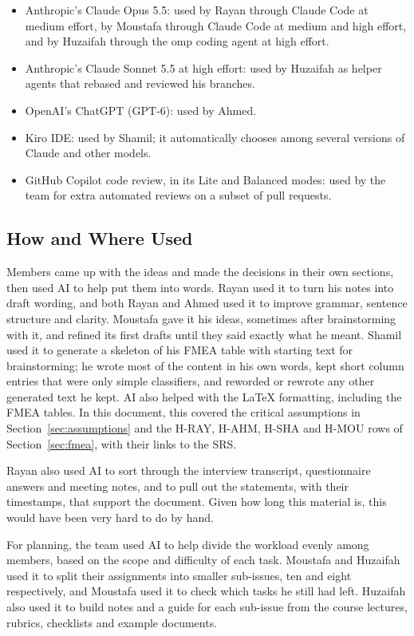 \documentclass{article}
\begin{document}
\begin{itemize}
  \item Anthropic's Claude Opus 5.5: used by Rayan through Claude Code at
    medium effort, by Moustafa through Claude Code at medium and high
    effort, and by Huzaifah through the omp coding agent at high effort.
  \item Anthropic's Claude Sonnet 5.5 at high effort: used by Huzaifah as
    helper agents that rebased and reviewed his branches.
  \item OpenAI's ChatGPT (GPT-6): used by Ahmed.
  \item Kiro IDE: used by Shamil; it automatically chooses among several
    versions of Claude and other models.
  \item GitHub Copilot code review, in its Lite and Balanced modes: used by
    the team for extra automated reviews on a subset of pull requests.
\end{itemize}

\subsection{How and Where Used}

Members came up with the ideas and made the decisions in their own sections,
then used AI to help put them into words. Rayan used it to turn his notes
into draft wording, and both Rayan and Ahmed used it to improve grammar,
sentence structure and clarity. Moustafa gave it his ideas, sometimes after
brainstorming with it, and refined its first drafts until they said exactly
what he meant. Shamil used it to generate a skeleton of his FMEA table with
starting text for brainstorming; he wrote most of the content in his own
words, kept short column entries that were only simple classifiers, and
reworded or rewrote any other generated text he kept. AI also helped
with the \LaTeX{} formatting, including the FMEA tables. In this document,
this covered the critical assumptions in Section~\ref{sec:assumptions} and
the H-RAY, H-AHM, H-SHA and H-MOU rows of Section~\ref{sec:fmea}, with their
links to the SRS.

Rayan also used AI to sort through the interview transcript, questionnaire
answers and meeting notes, and to pull out the statements, with their
timestamps, that support the document. Given how long this material is,
this would have been very hard to do by hand.

For planning, the team used AI to help divide the workload evenly among
members, based on the scope and difficulty of each task. Moustafa and
Huzaifah used it to split their assignments into smaller sub-issues, ten and
eight respectively, and Moustafa used it to check which tasks he still had
left. Huzaifah also used it to build notes and a guide for each sub-issue
from the course lectures, rubrics, checklists and example documents.
\end{document}
